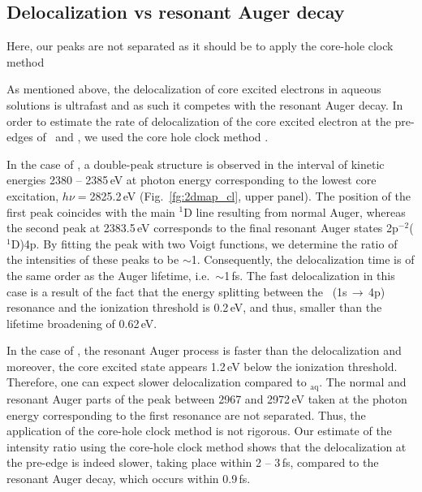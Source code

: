 \subsection{Delocalization vs resonant Auger decay}

{\color{red}Here, our peaks are not separated as it should be to apply the core-hole clock method}

As mentioned above, the delocalization of core excited electrons in aqueous solutions is ultrafast and as such it competes with the resonant Auger decay. In order to estimate the rate of delocalization of the core excited electron at the pre-edges of \ki~and \cli, we used the core hole clock method \cite{bjorneholm92:1892,karis96:1380}.


In the case of \cli, a double-peak structure is observed in the interval of kinetic energies 2380 -- 2385\,eV at photon energy corresponding to the lowest core excitation, $h\nu = $2825.2\,eV (Fig.\ \ref{fg:2dmap_cl}, upper panel). The position of the first peak coincides with the main $^1$D line resulting from normal Auger, whereas the second peak at 2383.5\,eV corresponds to the final resonant Auger states 2p$^{-2}$($^1$D)4p. By fitting the peak with two Voigt functions, we determine the ratio of the intensities of these peaks to be $\sim$1. Consequently, the delocalization time is of the same order as the Auger lifetime, i.e.\ $\sim$1\,fs. The fast delocalization in this case is a result of the fact that the energy splitting between the \cli~(1s$\,\rightarrow\,$4p) resonance and the ionization threshold is 0.2\,eV, and thus, smaller than the lifetime broadening of 0.62\,eV.


In the case of \ki, the resonant Auger process is faster than the delocalization and moreover, the core excited state appears 1.2\,eV below the ionization threshold. Therefore, one can expect slower delocalization compared to \cli$_{\text{aq}}$. The normal and resonant Auger parts of the peak between 2967 and 2972\,eV taken at the photon energy corresponding to the first resonance are not separated. Thus, the application of the core-hole clock method is not rigorous. Our estimate of the intensity ratio using the core-hole clock method shows that the delocalization at the pre-edge is indeed slower, taking place within 2 -- 3\,fs, compared to the resonant Auger decay, which occurs within 0.9\,fs.


